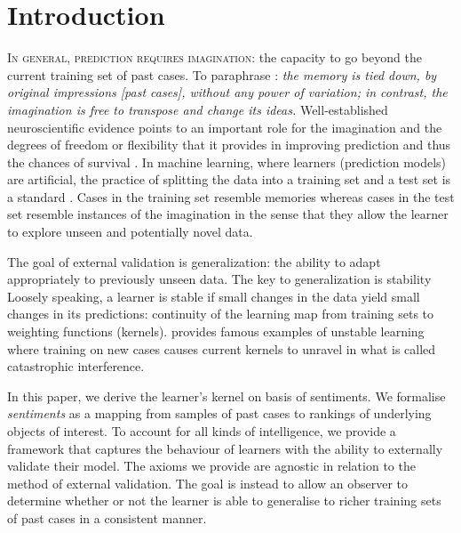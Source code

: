 \documentclass[ecta,nameyear,draft]{econsocart}
\theoremstyle{plain}
\theoremstyle{remark}
\begin{document}
\section{Introduction} \label{sec-introduction}
\textsc{In general, prediction requires imagination}: the capacity to go beyond
the current training set of past cases. To paraphrase \citep[pages 9 and
10]{hume1896treatise}: \emph{the memory is tied down, by original impressions
  \emph{[past cases]}, without any power of variation; in contrast, the
imagination is free to transpose and change its ideas.} Well-established
neuroscientific evidence points to an important role for the imagination and
the degrees of freedom or flexibility that it provides in improving prediction
and thus the chances of survival
\citep{bartlett1932remembering,suddendorf2007evolution,mullally2013memory}.  In
machine learning, where learners (prediction models) are artificial, the
practice of splitting the data into a training set and a test set is a standard
\citep{hastie2009elements}. Cases in the training set resemble memories whereas
cases in the test set resemble instances of the imagination in the sense that
they allow the learner to explore unseen and potentially novel data.

The goal of external validation is generalization: the ability to adapt
appropriately to previously unseen data.  The key to generalization is
stability \citep{bousquet2002stability,poggio2004general,mukherjee2006learning}
Loosely speaking, a learner is stable if small changes in the data yield small
changes in its predictions: continuity of the learning map from training sets
to weighting functions (kernels).  \cite{mccloskey1989catastrophic} provides
famous examples of unstable learning where training on new cases causes current
kernels to unravel in what is called catastrophic interference.

In this paper, we derive the learner's kernel on basis of {sentiments}.  We
formalise \emph{sentiments} as a mapping from samples of past cases to rankings
of underlying objects of interest.  To account for all kinds of intelligence,
we provide a framework that captures the behaviour of learners with the ability
to externally validate their model. The axioms we provide are agnostic in
relation to the method of external validation. The goal is instead to allow an
observer to determine whether or not the learner is able to generalise to
richer training sets of past cases in a consistent manner.
\end{document}
